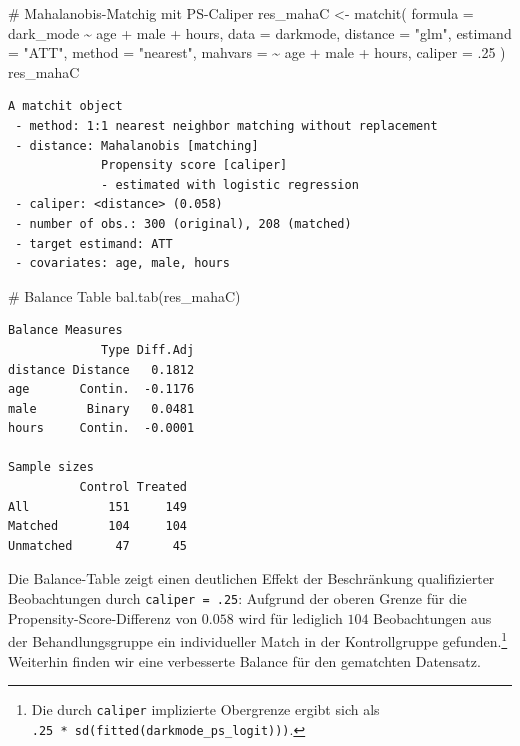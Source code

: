 \documentclass[
  a4paper,
  DIV=11,
  oneside]{scrreprt}
\newenvironment{Shaded}{\begin{snugshade}}{\end{snugshade}}
\newcommand{\AttributeTok}[1]{\textcolor[rgb]{0.40,0.45,0.13}{#1}}
\newcommand{\CommentTok}[1]{\textcolor[rgb]{0.37,0.37,0.37}{#1}}
\newcommand{\DecValTok}[1]{\textcolor[rgb]{0.68,0.00,0.00}{#1}}
\newcommand{\FunctionTok}[1]{\textcolor[rgb]{0.28,0.35,0.67}{#1}}
\newcommand{\NormalTok}[1]{\textcolor[rgb]{0.00,0.23,0.31}{#1}}
\newcommand{\OtherTok}[1]{\textcolor[rgb]{0.00,0.23,0.31}{#1}}
\newcommand{\SpecialCharTok}[1]{\textcolor[rgb]{0.37,0.37,0.37}{#1}}
\newcommand{\StringTok}[1]{\textcolor[rgb]{0.13,0.47,0.30}{#1}}
\begin{document}
\begin{Shaded}
\begin{Highlighting}[]
\CommentTok{\# Mahalanobis{-}Matchig mit PS{-}Caliper}
\NormalTok{res\_mahaC }\OtherTok{\textless{}{-}} \FunctionTok{matchit}\NormalTok{(}
  \AttributeTok{formula =}\NormalTok{ dark\_mode }\SpecialCharTok{\textasciitilde{}}\NormalTok{ age }\SpecialCharTok{+}\NormalTok{ male }\SpecialCharTok{+}\NormalTok{ hours, }
  \AttributeTok{data =}\NormalTok{ darkmode, }
  \AttributeTok{distance =} \StringTok{"glm"}\NormalTok{,}
  \AttributeTok{estimand =} \StringTok{"ATT"}\NormalTok{,}
  \AttributeTok{method =} \StringTok{"nearest"}\NormalTok{,}
  \AttributeTok{mahvars =} \SpecialCharTok{\textasciitilde{}}\NormalTok{ age }\SpecialCharTok{+}\NormalTok{ male }\SpecialCharTok{+}\NormalTok{ hours,}
  \AttributeTok{caliper =}\NormalTok{ .}\DecValTok{25}
\NormalTok{)}
\NormalTok{res\_mahaC}
\end{Highlighting}
\end{Shaded}

\begin{verbatim}
A matchit object
 - method: 1:1 nearest neighbor matching without replacement
 - distance: Mahalanobis [matching]
             Propensity score [caliper]
             - estimated with logistic regression
 - caliper: <distance> (0.058)
 - number of obs.: 300 (original), 208 (matched)
 - target estimand: ATT
 - covariates: age, male, hours
\end{verbatim}

\begin{Shaded}
\begin{Highlighting}[]
\CommentTok{\# Balance Table}
\FunctionTok{bal.tab}\NormalTok{(res\_mahaC)}
\end{Highlighting}
\end{Shaded}

\begin{verbatim}
Balance Measures
             Type Diff.Adj
distance Distance   0.1812
age       Contin.  -0.1176
male       Binary   0.0481
hours     Contin.  -0.0001

Sample sizes
          Control Treated
All           151     149
Matched       104     104
Unmatched      47      45
\end{verbatim}

Die Balance-Table zeigt einen deutlichen Effekt der Beschränkung
qualifizierter Beobachtungen durch \texttt{caliper\ =\ .25}: Aufgrund
der oberen Grenze für die Propensity-Score-Differenz von \(0.058\) wird
für lediglich \(104\) Beobachtungen aus der Behandlungsgruppe ein
individueller Match in der Kontrollgruppe gefunden.\footnote{Die durch
  \texttt{caliper} implizierte Obergrenze ergibt sich als
  \texttt{.25\ *\ sd(fitted(darkmode\_ps\_logit)))}.} Weiterhin finden
wir eine verbesserte Balance für den gematchten Datensatz.
\end{document}
